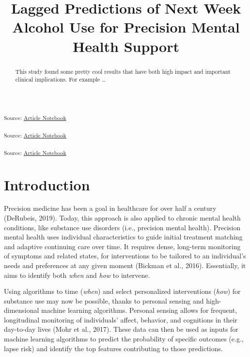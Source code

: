 \documentclass[
]{agujournal2019}
\begin{document}
\title{Lagged Predictions of Next Week Alcohol Use for Precision Mental
Health Support}



\begin{abstract}
This study found some pretty cool results that have both high impact and
important clinical implications. For example \ldots{}
\end{abstract}




\textsubscript{Source:
\href{https://jjcurtin.github.io/study_lag/index.qmd.html}{Article
Notebook}}

\textsubscript{Source:
\href{https://jjcurtin.github.io/study_lag/index.qmd.html}{Article
Notebook}}

\textsubscript{Source:
\href{https://jjcurtin.github.io/study_lag/index.qmd.html}{Article
Notebook}}

\section{Introduction}\label{introduction}

Precision medicine has been a goal in healthcare for over half a century
(DeRubeis, 2019). Today, this approach is also applied to chronic mental
health conditions, like substance use disorders (i.e., precision mental
health). Precision mental health uses individual characteristics to
guide initial treatment matching and adaptive continuing care over time.
It requires dense, long-term monitoring of symptoms and related states,
for interventions to be tailored to an individual's needs and
preferences at any given moment (Bickman et al., 2016). Essentially, it
aims to identify both \emph{when} and \emph{how} to intervene.

Using algorithms to time (\emph{when}) and select personalized
interventions (\emph{how}) for substance use may now be possible, thanks
to personal sensing and high-dimensional machine learning algorithms.
Personal sensing allows for frequent, longitudinal monitoring of
individuals' affect, behavior, and cognitions in their day-to-day lives
(Mohr et al., 2017). These data can then be used as inputs for machine
learning algorithms to predict the probability of specific outcomes
(e.g., lapse risk) and identify the top features contributing to those
predictions.
\end{document}
